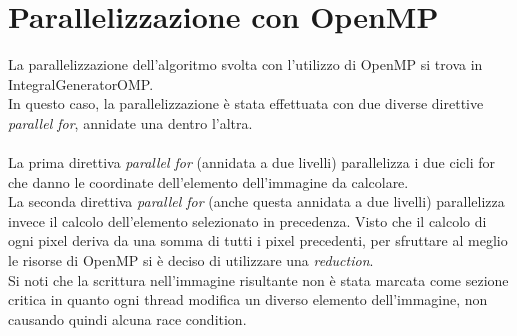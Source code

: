 \documentclass[10pt,twocolumn,letterpaper]{article}
\begin{document}
\section{Parallelizzazione con OpenMP}
La parallelizzazione dell’algoritmo svolta con l’utilizzo di OpenMP si trova in IntegralGeneratorOMP.\\
In questo caso, la parallelizzazione è stata effettuata con due diverse direttive \textit{parallel for}, annidate una dentro l'altra.\\
\\
La prima direttiva \textit{parallel for} (annidata a due livelli) parallelizza i due cicli for che danno le coordinate dell'elemento dell'immagine da calcolare.
\\
La seconda direttiva \textit{parallel for} (anche questa annidata a due livelli) parallelizza invece il calcolo dell'elemento selezionato in precedenza. Visto che il calcolo di ogni pixel deriva da una somma di tutti i pixel precedenti, per sfruttare al meglio le risorse di OpenMP si è deciso di utilizzare una \textit{reduction}.
\\
Si noti che la scrittura nell'immagine risultante non è stata marcata come sezione critica in quanto ogni thread modifica un diverso elemento dell'immagine, non causando quindi alcuna race condition.
\end{document}
